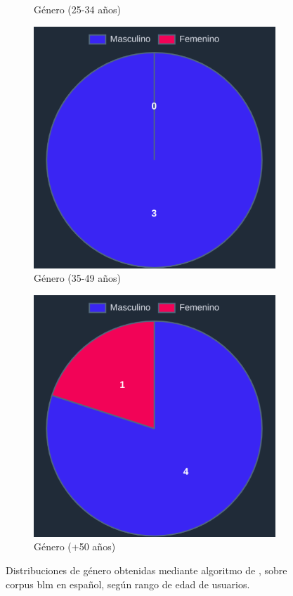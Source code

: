\begin{figure}[H]
\begin{subfigure}{0.3\textwidth}
  \caption{Género (25-34 años)}
  \end{subfigure}
  \begin{subfigure}{0.3\textwidth}
   \includegraphics[width=\textwidth]{imaxes/capturas-app/graficos/grivas/grafico-genero-v.png}
  \caption{Género (35-49 años)}
  \end{subfigure}
  \begin{subfigure}{0.3\textwidth}
   \includegraphics[width=\textwidth]{imaxes/capturas-app/graficos/grivas/grafico-genero-vv.png}
  \caption{Género (+50 años)}
  \end{subfigure}
  \caption{Distribuciones de género obtenidas mediante algoritmo de \citet{grivas2015author}, sobre corpus \acrshort{blm} en español, según rango de edad de usuarios.}
  \label{fig:blm/resultados-genero-grivas}
\end{figure}

